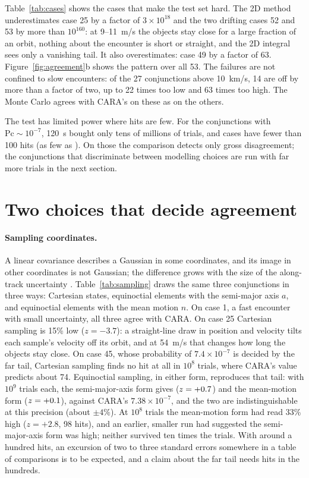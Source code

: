 \documentclass[11pt]{article}
\begin{document}
Table~\ref{tab:cases} shows the cases that make the test set hard. The 2D method underestimates
case 25 by a factor of $3\times10^{18}$ and the two drifting cases 52 and 53 by more than
$10^{160}$: at 9--11~m/s the objects stay close for a large fraction of an orbit, nothing about
the encounter is short or straight, and the 2D integral sees only a vanishing tail. It also
overestimates: case 49 by a factor of 63. Figure~\ref{fig:agreement}b shows the pattern over
all 53. The failures are not confined to slow encounters: of the 27 conjunctions above 10~km/s,
14 are off by more than a factor of two, up to 22 times too low and 63 times too high. The
Monte Carlo agrees with CARA's on these as on the others.

The test has limited power where hits are few. For the conjunctions with $\text{Pc} \sim
10^{-7}$, 120~s bought only tens of millions of trials, and \nFewHits{} cases have fewer than
100 hits (as few as \nMinHits). On those the comparison detects only gross disagreement; the
conjunctions that discriminate between modelling choices are run with far more trials in the
next section.

\section{Two choices that decide agreement}\label{sec:choices}

\paragraph{Sampling coordinates.} A linear covariance describes a Gaussian in some coordinates,
and its image in other coordinates is not Gaussian; the difference grows with the size of the
along-track uncertainty \cite{junkins1996}. Table~\ref{tab:sampling} draws the same three
conjunctions in three ways: Cartesian states, equinoctial elements with the semi-major axis
$a$, and equinoctial elements with the mean motion $n$. On case 1, a fast encounter with small
uncertainty, all three agree with CARA. On case 25 Cartesian sampling is 15\% low ($z=-3.7$):
a straight-line draw in position and velocity tilts each sample's velocity off its orbit, and
at 54~m/s that changes how long the objects stay close. On case 45, whose probability of
$7.4\times10^{-7}$ is decided by the far tail, Cartesian sampling finds no hit at all in
$10^8$ trials, where CARA's value predicts about 74. Equinoctial sampling, in either form,
reproduces that tail: with $10^9$ trials each, the semi-major-axis form gives \nTailPcA{}
($z=+0.7$) and the mean-motion form \nTailPcN{} ($z=+0.1$), against CARA's
$7.38\times10^{-7}$, and the two are indistinguishable at this precision (about $\pm4\%$). At
$10^8$ trials the mean-motion form had read 33\% high ($z=+2.8$, 98 hits), and an earlier,
smaller run had suggested the semi-major-axis form was high; neither survived ten times the
trials. With around a hundred hits, an excursion of two to three standard errors somewhere in a
table of comparisons is to be expected, and a claim about the far tail needs hits in the
hundreds.
\end{document}
